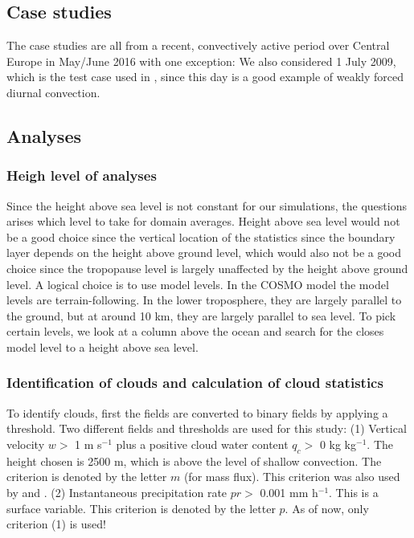 \documentclass[a4paper, 12pt]{article}
\begin{document}
\subsection{Case studies}
The case studies are all from a recent, convectively active period over Central Europe in May/June 2016 with one exception: We also considered 1 July 2009, which is the test case used in \cite{Kober2016}, since this day is a good example of weakly forced diurnal convection.  

\subsection{Analyses}

\subsubsection{Heigh level of analyses}
Since the height above sea level is not constant for our simulations, the questions arises which level to take for domain averages. Height above sea level would not be a good choice since the vertical location of the statistics since the boundary layer depends on the height above ground level, which would also not be a good choice since the tropopause level is largely unaffected by the height above ground level. A logical choice is to use model levels. In the COSMO model the model levels are terrain-following. In the lower troposphere, they are largely parallel to the ground, but at around 10 km, they are largely parallel to sea level. To pick certain levels, we look at a column above the ocean and search for the closes model level to a height above sea level. 

\subsubsection{Identification of clouds and calculation of cloud statistics}
To identify clouds, first the fields are converted to binary fields by applying a threshold. Two different fields and thresholds are used for this study: (1) Vertical velocity $w >$ 1 m s$^{-1}$ plus a positive cloud water content $q_c >$ 0 kg kg$^{-1}$. The height chosen is 2500 m, which is above the level of shallow convection. The criterion is denoted by the letter $m$ (for mass flux). This criterion was also used by \cite{Cohen2006} and \cite{Davoudi2010}. (2) Instantaneous precipitation rate $pr >$ 0.001 mm h$^{-1}$. This is a surface variable. This criterion is denoted by the letter $p$. As of now, only criterion (1) is used!
\end{document}
